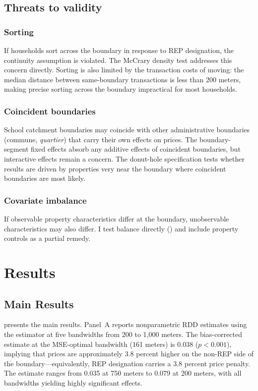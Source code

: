 \documentclass[12pt]{article}
\begin{document}
\subsection{Threats to validity}

\subsubsection*{Sorting} If households sort across the boundary in response to REP designation, the continuity assumption is violated. The McCrary density test addresses this concern directly. Sorting is also limited by the transaction costs of moving: the median distance between same-boundary transactions is less than 200 meters, making precise sorting across the boundary impractical for most households.

\subsubsection*{Coincident boundaries} School catchment boundaries may coincide with other administrative boundaries (commune, \textit{quartier}) that carry their own effects on prices. The boundary-segment fixed effects absorb any additive effects of coincident boundaries, but interactive effects remain a concern. The donut-hole specification tests whether results are driven by properties very near the boundary where coincident boundaries are most likely.

\subsubsection*{Covariate imbalance} If observable property characteristics differ at the boundary, unobservable characteristics may also differ. I test balance directly () and include property controls as a partial remedy.


\section{Results}
\label{sec:results}

\subsection{Main Results}

 presents the main results. Panel~A reports nonparametric RDD estimates using the \citet{cattaneo2020} estimator at five bandwidths from 200 to 1,000 meters. The bias-corrected estimate at the MSE-optimal bandwidth (161 meters) is 0.038 ($p < 0.001$), implying that prices are approximately 3.8 percent higher on the non-REP side of the boundary---equivalently, REP designation carries a 3.8 percent price penalty. The estimate ranges from 0.035 at 750 meters to 0.079 at 200 meters, with all bandwidths yielding highly significant effects.
\end{document}
